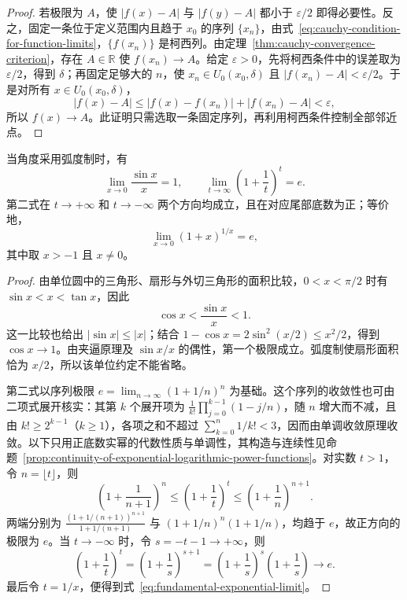 \begin{proof}
若极限为 $A$，使 $|f(x)-A|$ 与 $|f(y)-A|$ 都小于 $\varepsilon/2$ 即得必要性。反之，固定一条位于定义范围内且趋于 $x_0$ 的序列 $\{x_n\}$，由式~\eqref{eq:cauchy-condition-for-function-limits}，$\{f(x_n)\}$ 是柯西列。由定理~\ref{thm:cauchy-convergence-criterion}，存在 $A\in\mathbb{R}$ 使 $f(x_n)\to A$。给定 $\varepsilon>0$，先将柯西条件中的误差取为 $\varepsilon/2$，得到 $\delta$；再固定足够大的 $n$，使 $x_n\in U_0(x_0,\delta)$ 且 $|f(x_n)-A|<\varepsilon/2$。于是对所有 $x\in U_0(x_0,\delta)$，
\[
    |f(x)-A|\leq|f(x)-f(x_n)|+|f(x_n)-A|<\varepsilon,
\]
所以 $f(x)\to A$。此证明只需选取一条固定序列，再利用柯西条件控制全部邻近点。
\end{proof}

\begin{theorem}[两个重要极限]
\label{thm:two-fundamental-function-limits}
当角度采用弧度制时，有
\begin{equation}
    \lim_{x\to0}\frac{\sin x}{x}=1,
    \qquad
    \lim_{t\to\infty}\left(1+\frac1t\right)^t=e.
    \label{eq:two-fundamental-function-limits}
\end{equation}
第二式在 $t\to+\infty$ 和 $t\to-\infty$ 两个方向均成立，且在对应尾部底数为正；等价地，
\begin{equation}
    \lim_{x\to0}(1+x)^{1/x}=e,
    \label{eq:fundamental-exponential-limit}
\end{equation}
其中取 $x>-1$ 且 $x\neq0$。
\end{theorem}

\begin{proof}
由单位圆中的三角形、扇形与外切三角形的面积比较，$0<x<\pi/2$ 时有 $\sin x<x<\tan x$，因此
\[
    \cos x<\frac{\sin x}{x}<1.
\]
这一比较也给出 $|\sin x|\leq|x|$；结合 $1-\cos x=2\sin^2(x/2)\leq x^2/2$，得到 $\cos x\to1$。由夹逼原理及 $\sin x/x$ 的偶性，第一个极限成立。弧度制使扇形面积恰为 $x/2$，所以该单位约定不能省略。

第二式以序列极限 $e=\lim_{n\to\infty}(1+1/n)^n$ 为基础。这个序列的收敛性也可由二项式展开核实：其第 $k$ 个展开项为 $\frac1{k!}\prod_{j=0}^{k-1}(1-j/n)$，随 $n$ 增大而不减，且由 $k!\geq2^{k-1}$（$k\geq1$），各项之和不超过 $\sum_{k=0}^n1/k!<3$，因而由单调收敛原理收敛。以下只用正底数实幂的代数性质与单调性，其构造与连续性见命题~\ref{prop:continuity-of-exponential-logarithmic-power-functions}。对实数 $t>1$，令 $n=\lfloor t\rfloor$，则
\[
    \left(1+\frac1{n+1}\right)^n
    \leq\left(1+\frac1t\right)^t
    \leq\left(1+\frac1n\right)^{n+1}.
\]
两端分别为 $\frac{(1+1/(n+1))^{n+1}}{1+1/(n+1)}$ 与 $(1+1/n)^n(1+1/n)$，均趋于 $e$，故正方向的极限为 $e$。当 $t\to-\infty$ 时，令 $s=-t-1\to+\infty$，则
\[
    \left(1+\frac1t\right)^t
    =\left(1+\frac1s\right)^{s+1}
    =\left(1+\frac1s\right)^s\left(1+\frac1s\right)\to e.
\]
最后令 $t=1/x$，便得到式~\eqref{eq:fundamental-exponential-limit}。
\end{proof}


